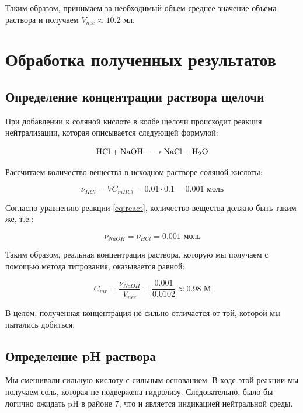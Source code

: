 \documentclass[a4paper, 12pt]{article}
\begin{document}
Таким образом, принимаем за необходимый объем среднее значение объема раствора и получаем $V_{nec} \approx 10.2$ мл.

\section{Обработка полученных результатов}

\subsection{Определение концентрации раствора щелочи}

При добавлении к соляной кислоте в колбе щелочи происходит реакция нейтрализации, которая описывается следующей формулой:

\begin{equation}
	\ce{HCl + NaOH -> NaCl + H2O}
	\label{eq:react}
\end{equation}

Рассчитаем количество вещества  в исходном растворе соляной кислоты:

\begin{equation}
		\nu_{HCl} = V C_{m HCl} = 0.01 \cdot 0.1 = 0.001 \text{ моль}
\end{equation}

Согласно уравнению реакции \ref{eq:react}, количество вещества  должно быть таким же, т.е.:

\begin{equation}
	\nu_{NaOH} = \nu_{HCl} = 0.001 \text{ моль}
\end{equation}

Таким образом, реальная концентрация раствора, которую мы получаем с помощью метода титрования, оказывается равной:

\begin{equation}
		\boxed{
		C_{mr} = \frac{\nu_{NaOH}}{V_{nec}} = \frac{0.001}{0.0102} \approx 0.98 \text{ М}
	}
\end{equation}

В целом, полученная концентрация не сильно отличается от той, которой мы пытались добиться.

\bigskip

\subsection{Определение pH раствора}

Мы смешивали сильную кислоту с сильным основанием. В ходе этой реакции мы получаем соль, которая не подвержена гидролизу. Следовательно, было бы логично ожидать pH в районе 7, что и является индикацией нейтральной среды.
\end{document}
